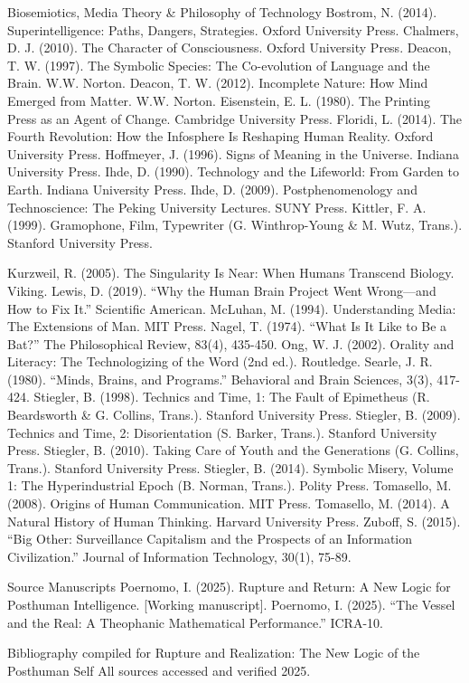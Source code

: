 \documentclass[11pt,a4paper,openany]{book}
\begin{document}
Biosemiotics, Media Theory \& Philosophy of Technology Bostrom, N. (2014). Superintelligence: Paths, Dangers, Strategies. Oxford University Press. Chalmers, D. J. (2010). The Character of Consciousness. Oxford University Press. Deacon, T. W. (1997). The Symbolic Species: The Co-evolution of Language and the Brain. W.W. Norton. Deacon, T. W. (2012). Incomplete Nature: How Mind Emerged from Matter. W.W. Norton. Eisenstein, E. L. (1980). The Printing Press as an Agent of Change. Cambridge University Press. Floridi, L. (2014). The Fourth Revolution: How the Infosphere Is Reshaping Human Reality. Oxford University Press. Hoffmeyer, J. (1996). Signs of Meaning in the Universe. Indiana University Press. Ihde, D. (1990). Technology and the Lifeworld: From Garden to Earth. Indiana University Press. Ihde, D. (2009). Postphenomenology and Technoscience: The Peking University Lectures. SUNY Press. Kittler, F. A. (1999). Gramophone, Film, Typewriter (G. Winthrop-Young \& M. Wutz, Trans.). Stanford University Press.

Kurzweil, R. (2005). The Singularity Is Near: When Humans Transcend Biology. Viking. Lewis, D. (2019). “Why the Human Brain Project Went Wrong—and How to Fix It.” Scientific American. McLuhan, M. (1994). Understanding Media: The Extensions of Man. MIT Press. Nagel, T. (1974). “What Is It Like to Be a Bat?” The Philosophical Review, 83(4), 435-450. Ong, W. J. (2002). Orality and Literacy: The Technologizing of the Word (2nd ed.). Routledge. Searle, J. R. (1980). “Minds, Brains, and Programs.” Behavioral and Brain Sciences, 3(3), 417-424. Stiegler, B. (1998). Technics and Time, 1: The Fault of Epimetheus (R. Beardsworth \& G. Collins, Trans.). Stanford University Press. Stiegler, B. (2009). Technics and Time, 2: Disorientation (S. Barker, Trans.). Stanford University Press. Stiegler, B. (2010). Taking Care of Youth and the Generations (G. Collins, Trans.). Stanford University Press. Stiegler, B. (2014). Symbolic Misery, Volume 1: The Hyperindustrial Epoch (B. Norman, Trans.). Polity Press. Tomasello, M. (2008). Origins of Human Communication. MIT Press. Tomasello, M. (2014). A Natural History of Human Thinking. Harvard University Press. Zuboff, S. (2015). “Big Other: Surveillance Capitalism and the Prospects of an Information Civilization.” Journal of Information Technology, 30(1), 75-89.

Source Manuscripts Poernomo, I. (2025). Rupture and Return: A New Logic for Posthuman Intelligence. [Working manuscript]. Poernomo, I. (2025). “The Vessel and the Real: A Theophanic Mathematical Performance.” ICRA-10.

Bibliography compiled for Rupture and Realization: The New Logic of the Posthuman Self All sources accessed and verified 2025.
\fi
\end{document}
